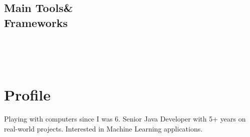 \documentclass[]{friggeri-cv}
\begin{document}
\begin{aside}
  \section{Main Tools\&\\Frameworks}
    ~
\end{aside}
~
\section{Profile}
{Playing with computers since I was 6. Senior Java Developer with 5+ years on real-world projects. Interested in Machine Learning applications.}
\end{document}
